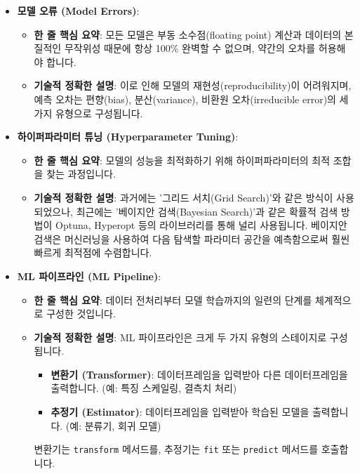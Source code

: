 \documentclass[11pt,a4paper]{article}
\theoremstyle{definition}
\begin{document}
\begin{itemize}
    \item \textbf{모델 오류 (Model Errors)}:
    \begin{itemize}
        \item \textbf{한 줄 핵심 요약}: 모든 모델은 부동 소수점(floating point) 계산과 데이터의 본질적인 무작위성 때문에 항상 100\% 완벽할 수 없으며, 약간의 오차를 허용해야 합니다.
        \item \textbf{기술적 정확한 설명}: 이로 인해 모델의 재현성(reproducibility)이 어려워지며, 예측 오차는 편향(bias), 분산(variance), 비환원 오차(irreducible error)의 세 가지 유형으로 구성됩니다.
    \end{itemize}

    \item \textbf{하이퍼파라미터 튜닝 (Hyperparameter Tuning)}:
    \begin{itemize}
        \item \textbf{한 줄 핵심 요약}: 모델의 성능을 최적화하기 위해 하이퍼파라미터의 최적 조합을 찾는 과정입니다.
        \item \textbf{기술적 정확한 설명}: 과거에는 '그리드 서치(Grid Search)'와 같은 방식이 사용되었으나, 최근에는 '베이지안 검색(Bayesian Search)'과 같은 확률적 검색 방법이 Optuna, Hyperopt 등의 라이브러리를 통해 널리 사용됩니다. 베이지안 검색은 머신러닝을 사용하여 다음 탐색할 파라미터 공간을 예측함으로써 훨씬 빠르게 최적점에 수렴합니다.
    \end{itemize}

    \item \textbf{ML 파이프라인 (ML Pipeline)}:
    \begin{itemize}
        \item \textbf{한 줄 핵심 요약}: 데이터 전처리부터 모델 학습까지의 일련의 단계를 체계적으로 구성한 것입니다.
        \item \textbf{기술적 정확한 설명}: ML 파이프라인은 크게 두 가지 유형의 스테이지로 구성됩니다.
        \begin{itemize}
            \item \textbf{변환기 (Transformer)}: 데이터프레임을 입력받아 다른 데이터프레임을 출력합니다. (예: 특징 스케일링, 결측치 처리)
            \item \textbf{추정기 (Estimator)}: 데이터프레임을 입력받아 학습된 모델을 출력합니다. (예: 분류기, 회귀 모델)
        \end{itemize}
        변환기는 \texttt{transform} 메서드를, 추정기는 \texttt{fit} 또는 \texttt{predict} 메서드를 호출합니다.
    \end{itemize}


\end{itemize}
\end{document}
